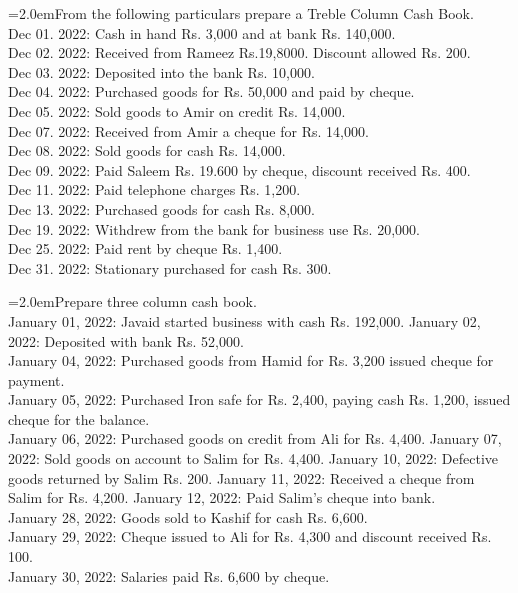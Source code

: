 \documentclass[11pt,a4paper]{article}
\newcommand{\lqn}[2]{\Needspace{6\baselineskip}\par\medskip\noindent\hangindent=2.0em\hangafter=1\makebox[2.0em][l]{\textbf{#1.}}#2\par}
\begin{document}
\lqn{62}{From the following particulars prepare a Treble Column Cash Book.\\
Dec 01. 2022:    Cash in hand Rs. 3,000 and at bank Rs. 140,000.\\
Dec 02. 2022:    Received from Rameez Rs.19,8000. Discount allowed Rs. 200.\\
Dec 03. 2022:    Deposited into the bank Rs. 10,000.\\
Dec 04. 2022:    Purchased goods for Rs. 50,000 and paid by cheque.\\
Dec 05. 2022:    Sold goods to Amir on credit Rs. 14,000.\\
Dec 07. 2022:    Received from Amir a cheque for Rs. 14,000.\\
Dec 08. 2022:    Sold goods for cash Rs. 14,000.\\
Dec 09. 2022:    Paid Saleem Rs. 19.600 by cheque, discount received Rs. 400.\\
Dec 11. 2022:    Paid telephone charges Rs. 1,200.\\
Dec 13. 2022:    Purchased goods for cash Rs. 8,000.\\
Dec 19. 2022:    Withdrew from the bank for business use Rs. 20,000.\\
Dec 25. 2022:    Paid rent by cheque Rs. 1,400.\\
Dec 31. 2022:    Stationary purchased for cash Rs. 300.\par
}
\lqn{63}{Prepare three column cash book.\\
January 01, 2022:          Javaid started business with cash Rs. 192,000. January 02, 2022:          Deposited with bank Rs. 52,000.\\
January 04, 2022:          Purchased goods from Hamid for Rs. 3,200 issued cheque for payment.\\
January 05, 2022:          Purchased Iron safe for Rs. 2,400, paying cash Rs. 1,200, issued cheque for the balance.\\
January 06, 2022:          Purchased goods on credit from Ali for Rs. 4,400. January 07, 2022:          Sold goods on account to Salim for Rs. 4,400. January 10, 2022:          Defective goods returned by Salim Rs. 200. January 11, 2022:          Received a cheque from Salim for Rs. 4,200. January 12, 2022:          Paid Salim’s cheque into bank.\\
January 28, 2022:          Goods sold to Kashif for cash Rs. 6,600.\\
January 29, 2022:          Cheque issued to Ali for Rs. 4,300 and discount received Rs. 100.\\
January 30, 2022:          Salaries paid Rs. 6,600 by cheque.\par
}
\end{document}

